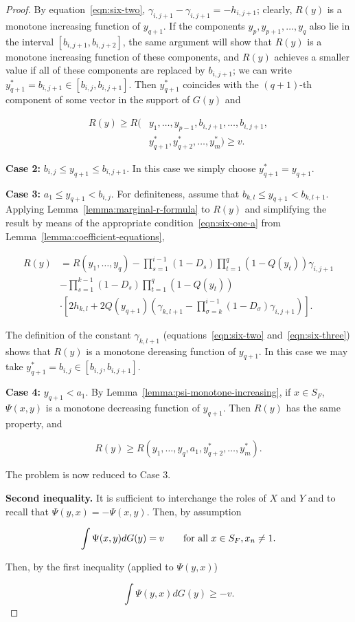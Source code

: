 \documentclass{article}
\begin{document}
\begin{proof}
By equation~\ref{eqn:six-two}, $\gamma_{i, j+1} - \gamma_{i, j+1} = -h_{i,
j+1}$; clearly, $R(y)$ is a monotone increasing function of $y_{q+1}$. If the
components $y_p, y_{p+1}, \dots, y_q$ also lie in the interval $[b_{i, j+1},
b_{i, j+2}]$, the same argument will show that $R(y)$ is a monotone increasing
function of these components, and $R(y)$ achieves a smaller value if all of
these components are replaced by $b_{i, j+1}$; we can write $y_{q+1}^* = b_{i,
j+1} \in [b_{i, j}, b_{i, j+1}]$. Then $y_{q+1}^*$ coincides with the
$(q+1)$-th component of some vector in the support of $G(y)$ and

\[
\begin{aligned}
R(y) \geq R(&y_1, \dots, y_{p-1}, b_{i, j+1}, \dots, b_{i, j+1}, \\
&y^*_{q+1}, y^*_{q+2}, \dots, y^*_{m}) \geq v.
\end{aligned}
\]

\textbf{Case 2:} $b_{i, j} \leq y_{q+1} \leq b_{i, j+1}$. In this case we
simply choose $y^*_{q+1} = y_{q+1}$.

\textbf{Case 3:} $a_1 \leq y_{q+1} < b_{i,j}$. For definiteness, assume that
$b_{k, l} \leq y_{q+1} < b_{k, l+1}$. Applying
Lemma~\ref{lemma:marginal-r-formula} to $R(y)$ and simplifying the result by
means of the appropriate condition~\ref{eqn:six-one-a} from
Lemma~\ref{lemma:coefficient-equations},

\[
\begin{aligned}
R(y) &= R(y_1, \dots, y_q) - \prod_{s=1}^{i-1} (1-D_s) \prod_{t=1}^q (1-Q(y_t))
\gamma_{i, j+1} \\
&- \prod_{s=1}^{k-1} (1-D_s) \prod_{t=1}^q (1-Q(y_t)) \\
& \cdot \left [ 2h_{k,l} + 2Q(y_{q+1}) \left ( \gamma_{k, l+1} -
\prod_{\sigma=k}^{i-1} (1-D_{\sigma}) \gamma_{i, j+1} \right ) \right ].
\end{aligned}
\]

The definition of the constant $\gamma_{k, l+1}$ (equations~\ref{eqn:six-two}
and~\ref{eqn:six-three}) shows that $R(y)$ is a monotone dereasing function of
$y_{q+1}$. In this case we may take $y^*_{q+1} = b_{i, j} \in [b_{i,j}, b_{i,
j+1}]$.

\textbf{Case 4:} $y_{q+1} < a_1$. By Lemma~\ref{lemma:psi-monotone-increasing},
if $x \in S_F$, $\Psi(x, y)$ is a monotone decreasing function of $y_{q+1}$.
Then $R(y)$ has the same property, and

\[
R(y) \geq R(y_1, \dots, y_q, a_1, y^*_{q+2}, \dots, y^*_m).
\]

The problem is now reduced to Case 3.

\textbf{Second inequality.} It is sufficient to interchange the roles of $X$
and $Y$ and to recall that $\Psi(y, x) = -\Psi(x, y)$. Then, by assumption

\[
\int \Psi(x, y) dG(y) = v \qquad \textup{for all } x \in S_F, x_n \neq 1.
\]

Then, by the first inequality (applied to $\Psi(y, x)$)

\[
\int \Psi(y, x) dG(y) \geq -v.
\]

\end{proof}
\end{document}
